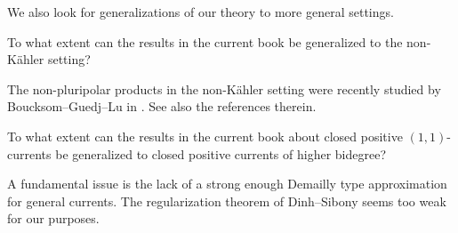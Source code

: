 We also look for generalizations of our theory to more general settings.
\begin{problem}\label{prob:history:L233}
    To what extent can the results in the current book be generalized to the non-K\"ahler setting?
\end{problem}

The non-pluripolar products in the non-K\"ahler setting were recently studied by Boucksom--Guedj--Lu in \cite{BGL24}. See also the references therein.

\begin{problem}\label{prob:history:L239}
    To what extent can the results in the current book about closed positive $(1,1)$-currents be generalized to closed positive currents of higher bidegree?
\end{problem}
A fundamental issue is the lack of a strong enough Demailly type approximation for general currents. The regularization theorem of Dinh--Sibony \cite{DS04} seems too weak for our purposes.
